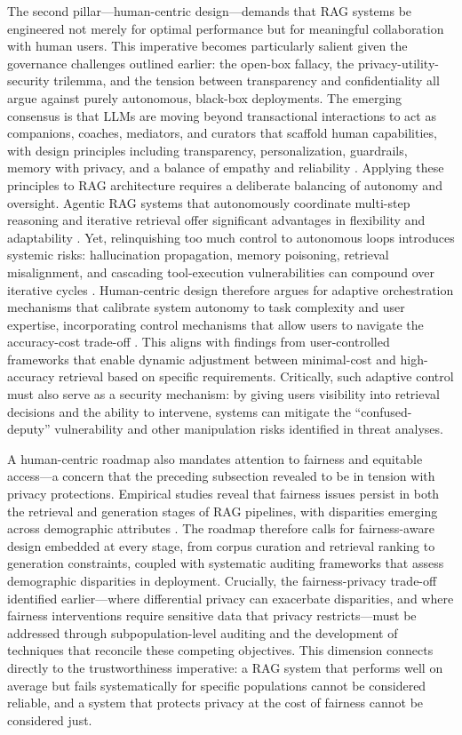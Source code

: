 \documentclass[11pt]{article}
\begin{document}
The second pillar---human-centric design---demands that RAG systems be engineered not merely for optimal performance but for meaningful collaboration with human users. This imperative becomes particularly salient given the governance challenges outlined earlier: the open-box fallacy, the privacy-utility-security trilemma, and the tension between transparency and confidentiality all argue against purely autonomous, black-box deployments. The emerging consensus is that LLMs are moving beyond transactional interactions to act as companions, coaches, mediators, and curators that scaffold human capabilities, with design principles including transparency, personalization, guardrails, memory with privacy, and a balance of empathy and reliability \cite{ref628}. Applying these principles to RAG architecture requires a deliberate balancing of autonomy and oversight. Agentic RAG systems that autonomously coordinate multi-step reasoning and iterative retrieval offer significant advantages in flexibility and adaptability \cite{ref22}. Yet, relinquishing too much control to autonomous loops introduces systemic risks: hallucination propagation, memory poisoning, retrieval misalignment, and cascading tool-execution vulnerabilities can compound over iterative cycles \cite{ref25}. Human-centric design therefore argues for adaptive orchestration mechanisms that calibrate system autonomy to task complexity and user expertise, incorporating control mechanisms that allow users to navigate the accuracy-cost trade-off \cite{ref629}. This aligns with findings from user-controlled frameworks that enable dynamic adjustment between minimal-cost and high-accuracy retrieval based on specific requirements. Critically, such adaptive control must also serve as a security mechanism: by giving users visibility into retrieval decisions and the ability to intervene, systems can mitigate the ``confused-deputy'' vulnerability and other manipulation risks identified in threat analyses.

A human-centric roadmap also mandates attention to fairness and equitable access---a concern that the preceding subsection revealed to be in tension with privacy protections. Empirical studies reveal that fairness issues persist in both the retrieval and generation stages of RAG pipelines, with disparities emerging across demographic attributes \cite{ref501}. The roadmap therefore calls for fairness-aware design embedded at every stage, from corpus curation and retrieval ranking to generation constraints, coupled with systematic auditing frameworks that assess demographic disparities in deployment. Crucially, the fairness-privacy trade-off identified earlier---where differential privacy can exacerbate disparities, and where fairness interventions require sensitive data that privacy restricts---must be addressed through subpopulation-level auditing and the development of techniques that reconcile these competing objectives. This dimension connects directly to the trustworthiness imperative: a RAG system that performs well on average but fails systematically for specific populations cannot be considered reliable, and a system that protects privacy at the cost of fairness cannot be considered just.
\end{document}
